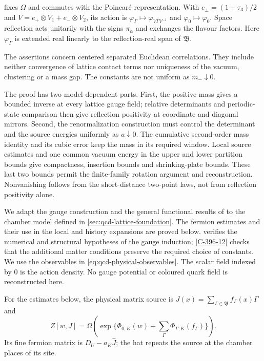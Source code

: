 \documentclass[11pt,letterpaper,reqno]{amsart}
\makeatletter
\theoremstyle{definition}
\newcommand{\ms@majorstart}{%
  \pushQED{\qed}\renewcommand{\qedsymbol}{$\blacksquare\square$}}
\newenvironment{theorem}[1][]{\ms@majorstart\ms@theorem[#1]}
  {\popQED\endms@theorem}
\theoremstyle{remark}
\makeatother
\begin{document}
\begin{theorem}[The massive two-colour theory]
\begin{enumerate}[label=\textup{(\roman*)}]
fixes $\Omega$ and commutes with the Poincar\'e representation.
With $e_\pm=(1\pm\tau_3)/2$ and
$V=e_+\otimes V_1+e_-\otimes V_2$, its action is
$\varphi_\Gamma\mapsto\varphi_{V\Gamma V^{-1}}$ and
$\varphi_0\mapsto\varphi_0$. Space reflection acts unitarily
with the signs $\pi_\alpha$ and exchanges the flavour factors.
Here $\varphi_\Gamma$ is extended real linearly to the reflection-real span of $\mathfrak B$.
\end{enumerate}
The assertions concern centered separated Euclidean correlations.
They include neither convergence of lattice contact terms nor
uniqueness of the vacuum, clustering or a mass gap. The constants
are not uniform as $m_-\downarrow0$.
\end{theorem}

The proof has two model-dependent parts. First, the positive mass
gives a bounded inverse at every lattice gauge field; relative
determinants and periodic-state comparison then give reflection
positivity at coordinate and diagonal mirrors. Second, the
renormalization construction must control the determinant and
the source energies uniformly as $a\downarrow0$. The cumulative
second-order mass identity and its cubic error keep the mass
in its required window. Local source estimates and one common
vacuum energy in the upper and lower partition bounds give
compactness, insertion bounds and shrinking-plate bounds.
These last two bounds permit the finite-family rotation argument
and reconstruction. Nonvanishing follows from the short-distance
two-point laws, not from reflection positivity alone.

We adapt the gauge construction and the general functional results
of \cite{YMM1} to the chamber model defined in
\cref{sec:qcd-lattice-foundation}. The fermion estimates and their
use in the local and history expansions are proved below.
 verifies the numerical and structural
hypotheses of the gauge induction; \cref{C-396-12} checks that the
additional matter conditions preserve the required choice of
constants. We use the observables in
\eqref{eq:qcd-physical-observables}. The scalar field indexed
by $0$ is the action density. No gauge potential or coloured
quark field is reconstructed here.

For the estimates below, the physical matrix source is
$J(x)=\sum_{\Gamma\in\mathfrak B}f_\Gamma(x)\Gamma$ and
\[
 Z[w,J]=\Omega\!\left(
     \exp\{\Phi_{0,K}(w)+\sum_\Gamma\Phi_{\Gamma,K}(f_\Gamma)\}
                  \right).
\]
Its fine fermion matrix is $D_U-a_K\hat J$; the hat repeats
the source at the chamber places of its site.
\end{document}
